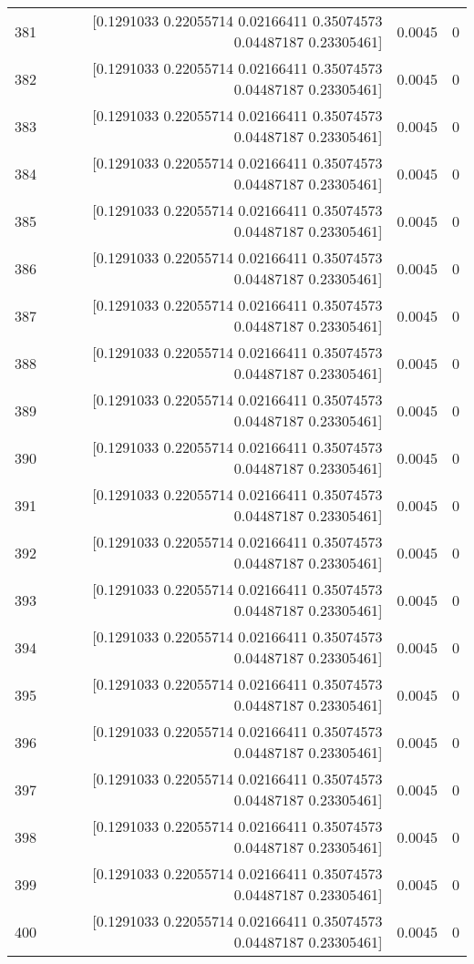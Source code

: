 \begin{longtable}{lrrr}
381 & [0.1291033  0.22055714 0.02166411 0.35074573 0.04487187 0.23305461] & 0.0045 & 0 \\
382 & [0.1291033  0.22055714 0.02166411 0.35074573 0.04487187 0.23305461] & 0.0045 & 0 \\
383 & [0.1291033  0.22055714 0.02166411 0.35074573 0.04487187 0.23305461] & 0.0045 & 0 \\
384 & [0.1291033  0.22055714 0.02166411 0.35074573 0.04487187 0.23305461] & 0.0045 & 0 \\
385 & [0.1291033  0.22055714 0.02166411 0.35074573 0.04487187 0.23305461] & 0.0045 & 0 \\
386 & [0.1291033  0.22055714 0.02166411 0.35074573 0.04487187 0.23305461] & 0.0045 & 0 \\
387 & [0.1291033  0.22055714 0.02166411 0.35074573 0.04487187 0.23305461] & 0.0045 & 0 \\
388 & [0.1291033  0.22055714 0.02166411 0.35074573 0.04487187 0.23305461] & 0.0045 & 0 \\
389 & [0.1291033  0.22055714 0.02166411 0.35074573 0.04487187 0.23305461] & 0.0045 & 0 \\
390 & [0.1291033  0.22055714 0.02166411 0.35074573 0.04487187 0.23305461] & 0.0045 & 0 \\
391 & [0.1291033  0.22055714 0.02166411 0.35074573 0.04487187 0.23305461] & 0.0045 & 0 \\
392 & [0.1291033  0.22055714 0.02166411 0.35074573 0.04487187 0.23305461] & 0.0045 & 0 \\
393 & [0.1291033  0.22055714 0.02166411 0.35074573 0.04487187 0.23305461] & 0.0045 & 0 \\
394 & [0.1291033  0.22055714 0.02166411 0.35074573 0.04487187 0.23305461] & 0.0045 & 0 \\
395 & [0.1291033  0.22055714 0.02166411 0.35074573 0.04487187 0.23305461] & 0.0045 & 0 \\
396 & [0.1291033  0.22055714 0.02166411 0.35074573 0.04487187 0.23305461] & 0.0045 & 0 \\
397 & [0.1291033  0.22055714 0.02166411 0.35074573 0.04487187 0.23305461] & 0.0045 & 0 \\
398 & [0.1291033  0.22055714 0.02166411 0.35074573 0.04487187 0.23305461] & 0.0045 & 0 \\
399 & [0.1291033  0.22055714 0.02166411 0.35074573 0.04487187 0.23305461] & 0.0045 & 0 \\
400 & [0.1291033  0.22055714 0.02166411 0.35074573 0.04487187 0.23305461] & 0.0045 & 0 \\

\end{longtable}
